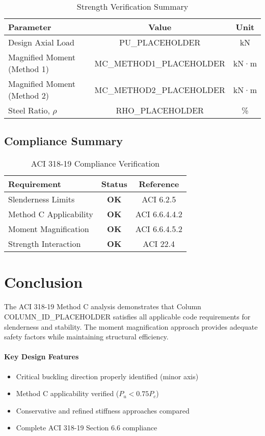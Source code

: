 \documentclass[
  10pt,
  letterpaper,
  twocolumn
]{article}
\begin{document}
\begin{table}[h]
\centering
\caption{Strength Verification Summary}
\label{tab:strength}
\begin{tabular}{@{}lcc@{}}
\toprule
\textbf{Parameter} & \textbf{Value} & \textbf{Unit} \\
\midrule
Design Axial Load & PU_PLACEHOLDER & kN \\
Magnified Moment (Method 1) & MC_METHOD1_PLACEHOLDER & kN·m \\
Magnified Moment (Method 2) & MC_METHOD2_PLACEHOLDER & kN·m \\
Steel Ratio, $\rho$ & RHO_PLACEHOLDER & \% \\
\bottomrule
\end{tabular}
\end{table}

\subsection{Compliance Summary}

\begin{table}[h]
\centering
\caption{ACI 318-19 Compliance Verification}
\label{tab:compliance}
\begin{tabular}{@{}lcc@{}}
\toprule
\textbf{Requirement} & \textbf{Status} & \textbf{Reference} \\
\midrule
Slenderness Limits & \textcolor{ghaligreen}{\textbf{OK}} & ACI 6.2.5 \\
Method C Applicability & \textcolor{ghaligreen}{\textbf{OK}} & ACI 6.6.4.4.2 \\
Moment Magnification & \textcolor{ghaligreen}{\textbf{OK}} & ACI 6.6.4.5.2 \\
Strength Interaction & \textcolor{ghaligreen}{\textbf{OK}} & ACI 22.4 \\
\bottomrule
\end{tabular}
\end{table}

\section{Conclusion}

The ACI 318-19 Method C analysis demonstrates that Column COLUMN_ID_PLACEHOLDER satisfies all applicable code requirements for slenderness and stability. The moment magnification approach provides adequate safety factors while maintaining structural efficiency.

\paragraph{Key Design Features}
\begin{itemize}
\item Critical buckling direction properly identified (minor axis)
\item Method C applicability verified ($P_u < 0.75P_c$)
\item Conservative and refined stiffness approaches compared
\item Complete ACI 318-19 Section 6.6 compliance
\end{itemize}
\end{document}
